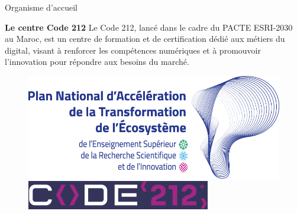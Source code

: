 \documentclass{beamer}
\begin{document}
\begin{frame}{Organisme d'accueil}
 
    \vspace{0.5cm} %
    \begin{block}{\centering \textbf{\Large Le centre Code 212}}
        \centering
        \vspace{0.2cm} %
        Le Code 212, lancé dans le cadre du PACTE ESRI-2030 au Maroc, est un centre de formation et de certification dédié aux métiers du digital, visant à renforcer les compétences numériques et à promouvoir l’innovation pour répondre aux besoins du marché.
    \end{block}

\begin{figure}[htpb]
    \centering
      \begin{minipage}[b]{0.45\linewidth}
        \centering
        \includegraphics[width=\linewidth]{pic/esri.png}
    \end{minipage}
    \begin{minipage}[b]{0.45\linewidth}
        \centering
        \includegraphics[width=\linewidth]{pic/code.png}
    \end{minipage}
\end{figure}
\end{frame}
\end{document}

